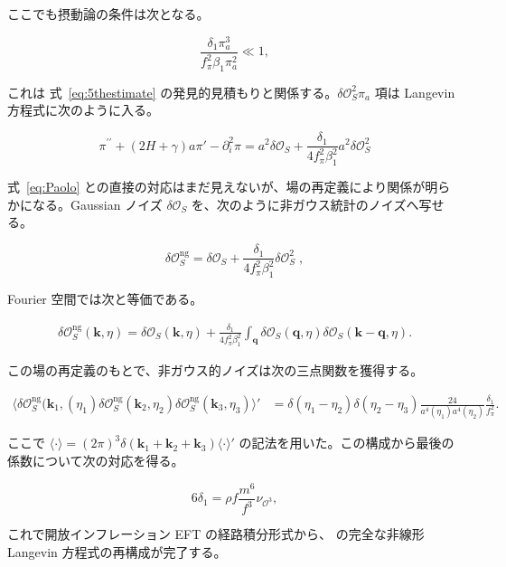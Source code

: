 \documentclass[a4paper,11pt]{ltjsarticle}
\numberwithin{equation}{section}
\def\pia{\pi_{a}}
\def\bfk{\textbf{k}}
\def\bfq{\textbf{q}}
\newcommand{\Os}{\delta \mathcal{O}_{S}}
\newcommand{\Eq}[1]{Eq.~(\ref{#1})}
\renewcommand{\Eq}[1]{式~\eqref{#1}}
\begin{document}
ここでも摂動論の条件は次となる。

\begin{equation}
\frac{\delta_{1}\pia^3}{f_{\pi}^{2}\beta_{1} \pia^2}\ll 1,
\end{equation}

これは \Eq{eq:5thestimate} の発見的見積もりと関係する。$\Os^2\pia$ 項は Langevin 方程式に次のように入る。

\begin{equation}
\pi^{\prime \prime}+\left( 2H + \gamma\right)a\pi'-\partial_{i}^{2}\pi=a^2 \Os+ \frac{ \delta_{1}}{4f_\pi^2\beta_{1}^{2}} a^2 \Os^{2}
\end{equation}

\Eq{eq:Paolo} との直接の対応はまだ見えないが、場の再定義により関係が明らかになる。Gaussian ノイズ $\Os$ を、次のように非ガウス統計のノイズへ写せる。

\begin{equation}
\Os^{\text{ng}}=\Os+\frac{\delta_{1}}{4f_\pi^2\beta_{1}^{2}}\Os^{2}\;,
\end{equation}

Fourier 空間では次と等価である。

\begin{align}
\delta\mathcal{O}_{S}^{\text{ng}}(\bfk, \eta)=\delta\mathcal{O}_{S}(\bfk,\eta)+\frac{\delta_{1}}{4f_\pi^2\beta_{1}^{2}}\int_{\bfq}\delta\mathcal{O}_{S}(\bfq, \eta)\delta\mathcal{O}_{S}(\bfk-\bfq, \eta).
\end{align}

この場の再定義のもとで、非ガウス的ノイズは次の三点関数を獲得する。

\begin{align}
\langle\Os^{\text{ng}}(\bfk_{1},(\eta_{1})\Os^{\text{ng}}(\bfk_{2},\eta_{2})\Os^{\text{ng}}(\bfk_{3},\eta_{3})\rangle'&= \delta(\eta_{1}-\eta_{2})\delta(\eta_{2}-\eta_{3})\frac{24}{a^{4}(\eta_{1})a^{4}(\eta_{2})}  \frac{\delta_1}{f_\pi^2}.
\end{align}

ここで $\langle\cdot\rangle=(2\pi)^3\delta(\bfk_1+\bfk_2+\bfk_3)\langle\cdot\rangle'$ の記法を用いた。この構成から最後の係数について次の対応を得る。

\begin{equation}
6\delta_1 = \rho f \frac{m^6}{f^3} \nu_{\mathcal{O}^3},
\end{equation}

これで開放インフレーション EFT の経路積分形式から、\cite{Creminelli:2023aly} の完全な非線形 Langevin 方程式の再構成が完了する。
\end{document}

